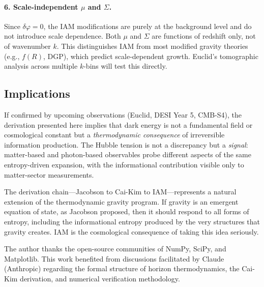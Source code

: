 \documentclass[aps,prd,twocolumn,superscriptaddress,nofootinbib]{revtex4-2}
\begin{document}
\paragraph{6. Scale-independent $\mu$ and $\Sigma$.}
Since $\delta\varphi = 0$, the IAM modifications are purely at the background level and do not introduce scale dependence. Both $\mu$ and $\Sigma$ are functions of redshift only, not of wavenumber $k$. This distinguishes IAM from most modified gravity theories (e.g., $f(R)$, DGP), which predict scale-dependent growth. Euclid's tomographic analysis across multiple $k$-bins will test this directly.

\subsection{Implications}

If confirmed by upcoming observations (Euclid, DESI Year 5, CMB-S4), the derivation presented here implies that dark energy is not a fundamental field or cosmological constant but a \textit{thermodynamic consequence} of irreversible information production. The Hubble tension is not a discrepancy but a \textit{signal}: matter-based and photon-based observables probe different aspects of the same entropy-driven expansion, with the informational contribution visible only to matter-sector measurements.

The derivation chain---Jacobson to Cai-Kim to IAM---represents a natural extension of the thermodynamic gravity program. If gravity is an emergent equation of state, as Jacobson proposed, then it should respond to all forms of entropy, including the informational entropy produced by the very structures that gravity creates. IAM is the cosmological consequence of taking this idea seriously.

\begin{acknowledgments}
The author thanks the open-source communities of NumPy, SciPy, and Matplotlib. This work benefited from discussions facilitated by Claude (Anthropic) regarding the formal structure of horizon thermodynamics, the Cai-Kim derivation, and numerical verification methodology.
\end{acknowledgments}
\end{document}
